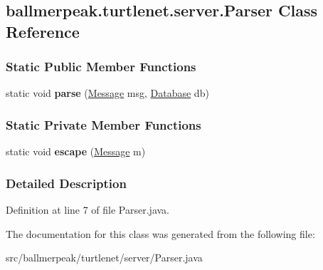 \hypertarget{classballmerpeak_1_1turtlenet_1_1server_1_1Parser}{\subsection{ballmerpeak.\-turtlenet.\-server.\-Parser Class Reference}
\label{classballmerpeak_1_1turtlenet_1_1server_1_1Parser}
}
\subsubsection*{Static Public Member Functions}
\begin{DoxyCompactItemize}
\item 
\hypertarget{classballmerpeak_1_1turtlenet_1_1server_1_1Parser_ae9ca91378147b1b5b66e6ed824050b24}{static void {\bfseries parse} (\hyperlink{classballmerpeak_1_1turtlenet_1_1shared_1_1Message}{Message} msg, \hyperlink{classballmerpeak_1_1turtlenet_1_1server_1_1Database}{Database} db)}\label{classballmerpeak_1_1turtlenet_1_1server_1_1Parser_ae9ca91378147b1b5b66e6ed824050b24}

\end{DoxyCompactItemize}
\subsubsection*{Static Private Member Functions}
\begin{DoxyCompactItemize}
\item 
\hypertarget{classballmerpeak_1_1turtlenet_1_1server_1_1Parser_a7fbaf78c66fb1ab467c9c66605e3c3e8}{static void {\bfseries escape} (\hyperlink{classballmerpeak_1_1turtlenet_1_1shared_1_1Message}{Message} m)}\label{classballmerpeak_1_1turtlenet_1_1server_1_1Parser_a7fbaf78c66fb1ab467c9c66605e3c3e8}

\end{DoxyCompactItemize}


\subsubsection{Detailed Description}


Definition at line 7 of file Parser.\-java.



The documentation for this class was generated from the following file\-:\begin{DoxyCompactItemize}
\item 
src/ballmerpeak/turtlenet/server/Parser.\-java\end{DoxyCompactItemize}
